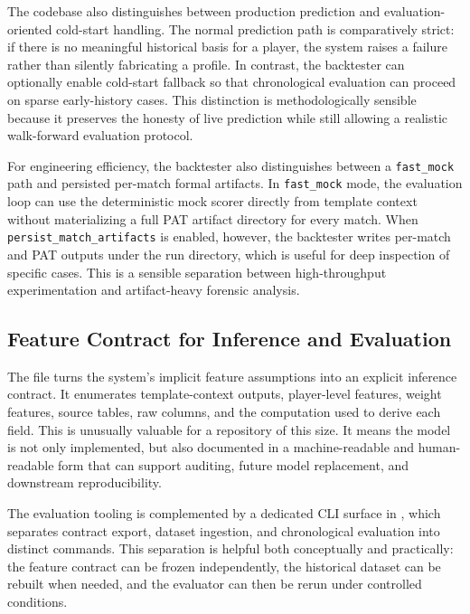 \documentclass{article}
\begin{document}
The codebase also distinguishes between production prediction and evaluation-oriented cold-start handling. The normal prediction path is comparatively strict: if there is no meaningful historical basis for a player, the system raises a failure rather than silently fabricating a profile. In contrast, the backtester can optionally enable cold-start fallback so that chronological evaluation can proceed on sparse early-history cases. This distinction is methodologically sensible because it preserves the honesty of live prediction while still allowing a realistic walk-forward evaluation protocol.

For engineering efficiency, the backtester also distinguishes between a \texttt{fast\_mock} path and persisted per-match formal artifacts. In \texttt{fast\_mock} mode, the evaluation loop can use the deterministic mock scorer directly from template context without materializing a full PAT artifact directory for every match. When \texttt{persist\_match\_artifacts} is enabled, however, the backtester writes per-match  and PAT outputs under the run directory, which is useful for deep inspection of specific cases. This is a sensible separation between high-throughput experimentation and artifact-heavy forensic analysis.

\subsection*{Feature Contract for Inference and Evaluation}
The file  turns the system's implicit feature assumptions into an explicit inference contract. It enumerates template-context outputs, player-level features, weight features, source tables, raw columns, and the computation used to derive each field. This is unusually valuable for a repository of this size. It means the model is not only implemented, but also documented in a machine-readable and human-readable form that can support auditing, future model replacement, and downstream reproducibility.

The evaluation tooling is complemented by a dedicated CLI surface in , which separates contract export, dataset ingestion, and chronological evaluation into distinct commands. This separation is helpful both conceptually and practically: the feature contract can be frozen independently, the historical dataset can be rebuilt when needed, and the evaluator can then be rerun under controlled conditions.
\end{document}
